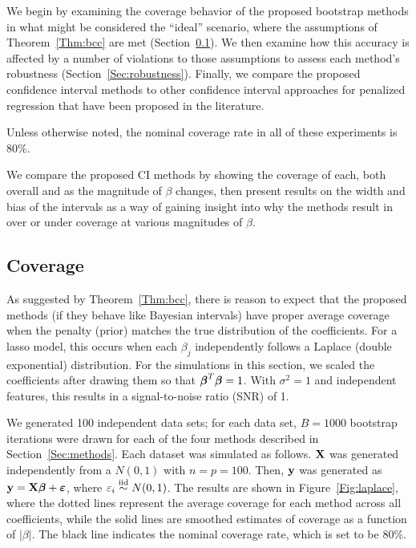 We begin by examining the coverage behavior of the proposed bootstrap methods in what might be considered the ``ideal'' scenario, where the assumptions of Theorem~\ref{Thm:bcc} are met (Section~\ref{Sec:Coverage}). We then examine how this accuracy is affected by a number of violations to those assumptions to assess each method's robustness (Section~\ref{Sec:robustness}). Finally, we compare the proposed confidence interval methods to other confidence interval approaches for penalized regression that have been proposed in the literature. 

Unless otherwise noted, the nominal coverage rate in all of these experiments is 80\%.

We compare the proposed CI methods by showing the coverage of each, both overall and as the magnitude of $\beta$ changes, then present results on the width and bias of the intervals as a way of gaining insight into why the methods result in over or under coverage at various magnitudes of $\beta$.

\subsection{Coverage}\label{Sec:Coverage}

As suggested by Theorem~\ref{Thm:bcc}, there is reason to expect that the proposed methods (if they behave like Bayesian intervals) have proper average coverage when the penalty (prior) matches the true distribution of the coefficients. For a lasso model, this occurs when each $\beta_j$ independently follows a Laplace (double exponential) distribution. For the simulations in this section, we scaled the coefficients after drawing them so that $\boldsymbol{\beta}^T\boldsymbol{\beta} = 1$. With $\sigma^2=1$ and independent features, this results in a signal-to-noise ratio (SNR) of 1.

We generated 100 independent data sets; for each data set, $B = 1000$ bootstrap iterations were drawn for each of the four methods described in Section~\ref{Sec:methods}. Each dataset was simulated as follows. $\mathbf{X}$ was generated independently from a $N(0, 1)$ with $n = p = 100$. Then, $\mathbf{y}$ was generated as $\mathbf{y} = \mathbf{X}\boldsymbol{\beta} + \boldsymbol{\varepsilon}$, where $\varepsilon_i \overset{\text{iid}}{\sim} N(0, 1)$. The results are shown in Figure~\ref{Fig:laplace}, where the dotted lines represent the average coverage for each method across all coefficients, while the solid lines are smoothed estimates of coverage as a function of $|\beta|$. The black line indicates the nominal coverage rate, which is set to be 80\%.

